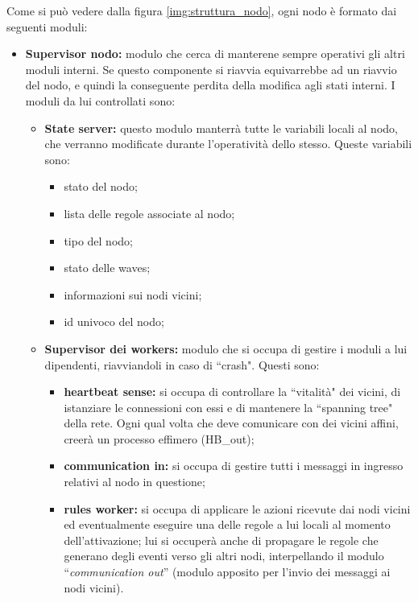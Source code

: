 \documentclass[italian]{memoir}
\begin{document}
Come si può vedere dalla figura \ref{img:struttura_nodo}, ogni nodo è formato dai
	   seguenti moduli:
\begin{itemize}
	\item \textbf{Supervisor nodo:} modulo che cerca di manterene sempre operativi gli
	   altri moduli interni. Se questo componente si riavvia equivarrebbe ad un riavvio
	   del nodo, e quindi la conseguente perdita della modifica agli stati interni.
	   I moduli
	   da lui controllati sono:
	\begin{itemize}
	\item \textbf{State server:} questo modulo manterrà tutte le variabili locali al
	   nodo, che verranno modificate durante l'operatività dello stesso. Queste variabili
	   sono:
		\begin{itemize}
		\item stato del nodo;
		\item lista delle regole associate al nodo;
		\item tipo del nodo;
		\item stato delle waves; %
		\item informazioni sui nodi vicini;
		\item id univoco del nodo;
		\end{itemize}
	\item \textbf{Supervisor dei workers:} modulo che si occupa di gestire i moduli
	   a lui dipendenti, riavviandoli in caso di ``crash". Questi sono:
		\begin{itemize}
		\item \textbf{heartbeat sense:} si occupa di controllare la ``vitalità" dei vicini,
	     di istanziare le connessioni con essi e di mantenere la ``spanning tree" della rete.
	     Ogni qual volta che deve comunicare con dei vicini affini, creerà un processo effimero
	     (HB\_out);
		\item \textbf{communication in:} si occupa di gestire tutti i messaggi in ingresso
	   relativi al nodo in questione;
		\item \textbf{rules worker:} si occupa di applicare le azioni ricevute dai nodi
	   vicini ed eventualmente eseguire una delle regole a lui locali al momento dell'attivazione;
	   lui si occuperà anche di propagare le regole che generano degli eventi verso
	   gli
	   altri nodi, interpellando il modulo ``\textit{communication out}'' 
	  (modulo apposito per l'invio dei messaggi ai nodi vicini).
		\end{itemize}
	\end{itemize}
\end{itemize}
\end{document}
